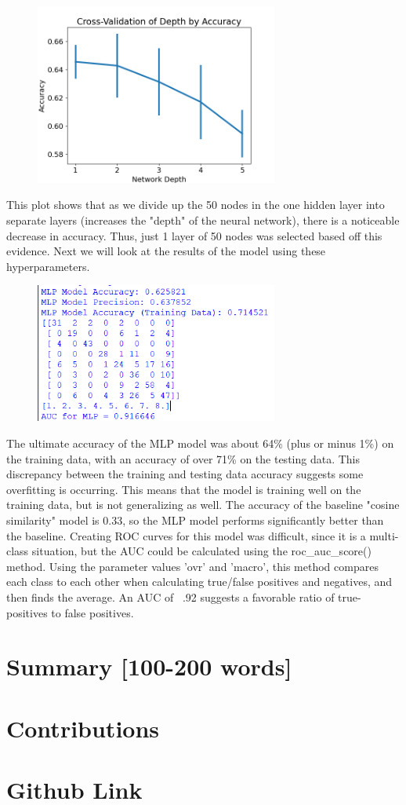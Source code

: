 \documentclass[12pt, a4]{article} %
\begin{document}
\begin{figure}[h]
\includegraphics[width=8cm]{Cross-Val Depth.png}
\end{figure}

This plot shows that as we divide up the 50 nodes in the one hidden layer into separate layers (increases the "depth" of the neural network), there is a noticeable decrease
in accuracy.  Thus, just 1 layer of 50 nodes was selected based off this evidence.  Next we will look at the results of the model using these hyperparameters.  
\begin{figure}[h]
\includegraphics[width=8cm]{outputMLP.png}
\end{figure}
The ultimate accuracy of the MLP model was about 64\% (plus or minus 1\%) on the training data, with an accuracy of over 71\% on the testing data.  This discrepancy between the training and testing data accuracy suggests some overfitting is occurring.  This means that the model is training well on the training data, but is not generalizing as well.  The accuracy of the baseline "cosine similarity" model is 0.33, so the MLP model performs significantly better than the baseline.  Creating ROC curves for this model was difficult, since it is a multi-class situation, but the AUC could be calculated using the roc\_auc\_score() method.  Using the parameter values 'ovr' and 'macro', this method compares each class to each other when calculating true/false positives and negatives, and then finds the average.  An AUC of ~.92 suggests a favorable ratio of true-positives to false positives.    
\section{Summary [100-200 words]}
\section{Contributions}
\section{Github Link}
\end{document}
